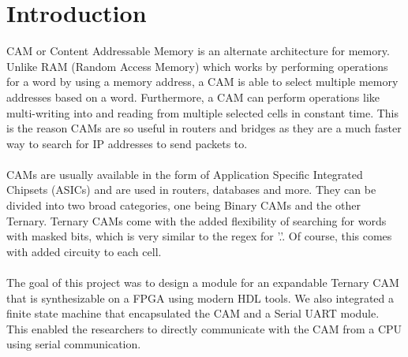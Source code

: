 \section{Introduction}
CAM or Content Addressable Memory is an alternate architecture for memory. Unlike RAM (Random Access Memory) which works by 
performing operations for a word by using a memory address, a CAM is able to select multiple memory addresses based on a word. 
Furthermore, a CAM can perform operations like multi-writing into and reading from multiple selected cells in constant time.
This is the reason CAMs are so useful in routers and bridges as they are a much faster way to search for IP addresses to send packets to.
\\\\  
CAMs are usually available in the form of Application Specific Integrated Chipsets (ASICs) and are used in routers, databases and more.
They can be divided into two broad categories, one being Binary CAMs and the other Ternary. 
Ternary CAMs come with the added flexibility of searching for words with masked bits, which is very similar to the regex for '.'. 
Of course, this comes with added circuity to each cell. 
\\\\ 
The goal of this project was to design a module for an expandable Ternary CAM that is synthesizable on a FPGA using modern HDL tools. 
We also integrated a finite state machine that encapsulated the CAM and a Serial UART module. 
This enabled the researchers to directly communicate with the CAM from a CPU using serial communication. 
